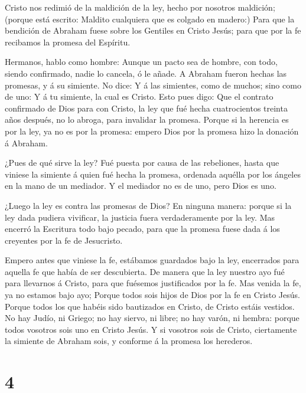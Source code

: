  Cristo nos redimió de la maldición de la ley, hecho por
nosotros maldición; (porque está escrito: Maldito cualquiera que es
colgado en madero:)  Para que la bendición de Abraham fuese
sobre los Gentiles en Cristo Jesús; para que por la fe recibamos la
promesa del Espíritu.

 Hermanos, hablo como hombre: Aunque un pacto sea de
hombre, con todo, siendo confirmado, nadie lo cancela, ó le añade.
 A Abraham fueron hechas las promesas, y á su simiente. No
dice: Y á las simientes, como de muchos; sino como de uno: Y á tu
simiente, la cual es Cristo.  Esto pues digo: Que el
contrato confirmado de Dios para con Cristo, la ley que fué hecha
cuatrocientos treinta años después, no lo abroga, para invalidar la
promesa.  Porque si la herencia es por la ley, ya no es por
la promesa: empero Dios por la promesa hizo la donación á Abraham.

 ¿Pues de qué sirve la ley? Fué puesta por causa de las
rebeliones, hasta que viniese la simiente á quien fué hecha la promesa,
ordenada aquélla por los ángeles en la mano de un mediador.
 Y el mediador no es de uno, pero Dios es uno.

 ¿Luego la ley es contra las promesas de Dios? En ninguna
manera: porque si la ley dada pudiera vivificar, la justicia fuera
verdaderamente por la ley.  Mas encerró la Escritura todo
bajo pecado, para que la promesa fuese dada á los creyentes por la fe de
Jesucristo.

 Empero antes que viniese la fe, estábamos guardados bajo
la ley, encerrados para aquella fe que había de ser descubierta.
 De manera que la ley nuestro ayo fué para llevarnos á
Cristo, para que fuésemos justificados por la fe.  Mas
venida la fe, ya no estamos bajo ayo;  Porque todos sois
hijos de Dios por la fe en Cristo Jesús.  Porque todos los
que habéis sido bautizados en Cristo, de Cristo estáis vestidos.
 No hay Judío, ni Griego; no hay siervo, ni libre; no hay
varón, ni hembra: porque todos vosotros sois uno en Cristo Jesús.
 Y si vosotros sois de Cristo, ciertamente la simiente de
Abraham sois, y conforme á la promesa los herederos.

\hypertarget{section-3}{%
\section{4}\label{section-3}}

